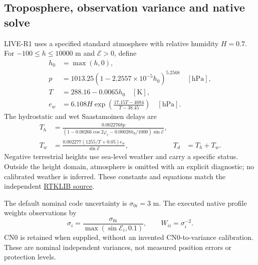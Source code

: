 \clearpage
\subsection{Troposphere, observation variance and native solve}
\label{sec:live-observation-equation}

LIVE-R1 uses a specified standard atmosphere with relative humidity $H=0.7$.
For $-100\leq h\leq10000$ m and $\mathcal E>0$, define
\begin{align}
 h_0&=\max(h,0),\\
 p&=1013.25(1-2.2557\times10^{-5}h_0)^{5.2568}\quad[\mathrm{hPa}],\\
 T&=288.16-0.0065h_0\quad[\mathrm K],\\
 e_w&=6.108H\exp\!\left(\frac{17.15T-4684}{T-38.45}\right)
       \quad[\mathrm{hPa}].
\end{align}
The hydrostatic and wet Saastamoinen delays are
\begin{align}
 T_h&=\frac{0.0022768p}
 {(1-0.00266\cos2\varphi_r-0.00028h_0/1000)\sin\mathcal E},\\
 T_w&=\frac{0.002277(1255/T+0.05)e_w}{\sin\mathcal E},
 &T_d&=T_h+T_w.
 \label{eq:live-saastamoinen}
\end{align}
Negative terrestrial heights use sea-level weather and carry a specific status.
Outside the height domain, atmosphere is omitted with an explicit diagnostic;
no calibrated weather is inferred. These constants and equations match the
independent \href{https://github.com/tomojitakasu/RTKLIB/blob/71db0ffa/src/rtkcmn.c}{RTKLIB
 source}.

The default nominal code uncertainty is $\sigma_{0i}=3$ m. The executed native
profile weights observations by
\begin{equation}
 \sigma_i=\frac{\sigma_{0i}}{\max(\sin\mathcal E_i,0.1)},
 \qquad W_{ii}=\sigma_i^{-2}.
 \label{eq:live-weight}
\end{equation}
CN0 is retained when supplied, without an invented CN0-to-variance calibration.
These are nominal independent variances, not measured position errors or
protection levels.

